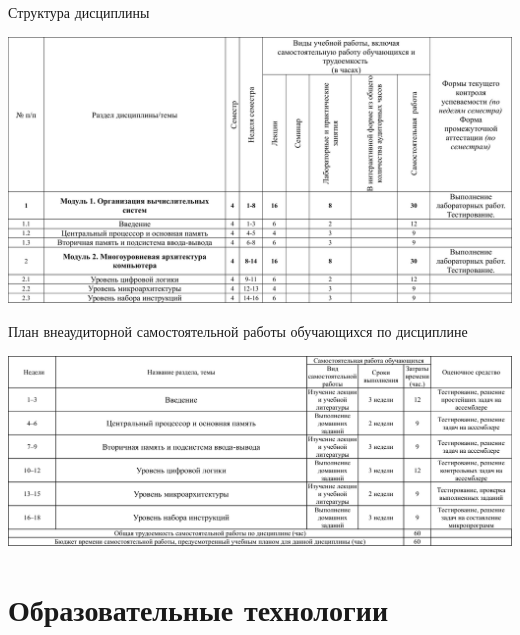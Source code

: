 \begin{landscape}
\pagestyle{empty}

\begin{table}[h]
\caption{Структура дисциплины}
\centering
\includegraphics[width=\linewidth]{t1.pdf}
\end{table}


\begin{table}[h]
\caption{План внеаудиторной самостоятельной работы обучающихся по дисциплине}
\centering
\includegraphics[width=\linewidth]{t2.pdf}
\end{table}
\end{landscape}



\section{Образовательные технологии}

